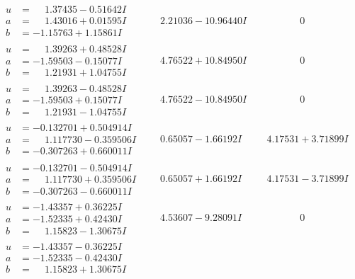 \documentclass[1p]{elsarticle_modified}
\theoremstyle{definition}
\begin{document}
$$\begin{array}{c|c|c}
\begin{aligned}
u &= \phantom{-}1.37435 - 0.51642 I \\
a &= \phantom{-}1.43016 + 0.01595 I \\
b &= -1.15763 + 1.15861 I\end{aligned}
 & \phantom{-}2.21036 - 10.96440 I & \phantom{-0.000000 } 0 \\ \hline\begin{aligned}
u &= \phantom{-}1.39263 + 0.48528 I \\
a &= -1.59503 - 0.15077 I \\
b &= \phantom{-}1.21931 + 1.04755 I\end{aligned}
 & \phantom{-}4.76522 + 10.84950 I & \phantom{-0.000000 } 0 \\ \hline\begin{aligned}
u &= \phantom{-}1.39263 - 0.48528 I \\
a &= -1.59503 + 0.15077 I \\
b &= \phantom{-}1.21931 - 1.04755 I\end{aligned}
 & \phantom{-}4.76522 - 10.84950 I & \phantom{-0.000000 } 0 \\ \hline\begin{aligned}
u &= -0.132701 + 0.504914 I \\
a &= \phantom{-}1.117730 - 0.359506 I \\
b &= -0.307263 + 0.660011 I\end{aligned}
 & \phantom{-}0.65057 - 1.66192 I & \phantom{-}4.17531 + 3.71899 I \\ \hline\begin{aligned}
u &= -0.132701 - 0.504914 I \\
a &= \phantom{-}1.117730 + 0.359506 I \\
b &= -0.307263 - 0.660011 I\end{aligned}
 & \phantom{-}0.65057 + 1.66192 I & \phantom{-}4.17531 - 3.71899 I \\ \hline\begin{aligned}
u &= -1.43357 + 0.36225 I \\
a &= -1.52335 + 0.42430 I \\
b &= \phantom{-}1.15823 - 1.30675 I\end{aligned}
 & \phantom{-}4.53607 - 9.28091 I & \phantom{-0.000000 } 0 \\ \hline\begin{aligned}
u &= -1.43357 - 0.36225 I \\
a &= -1.52335 - 0.42430 I \\
b &= \phantom{-}1.15823 + 1.30675 I\end{aligned}

\end{array}$$
\end{document}
